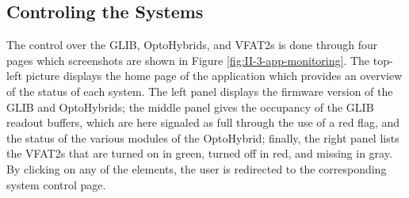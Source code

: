     \subsection{Controling the Systems}

      The control over the GLIB, OptoHybrids, and VFAT2s is done through four pages which screenshots are shown in Figure \ref{fig:II-3-app-monitoring}. The top-left picture displays the home page of the application which provides an overview of the status of each system. The left panel displays the firmware version of the GLIB and OptoHybrids; the middle panel gives the occupancy of the GLIB readout buffers, which are here signaled as full through the use of a red flag, and the status of the various modules of the OptoHybrid; finally, the right panel lists the VFAT2s that are turned on in green, turned off in red, and missing in gray. By clicking on any of the elements, the user is redirected to the corresponding system control page. \\

